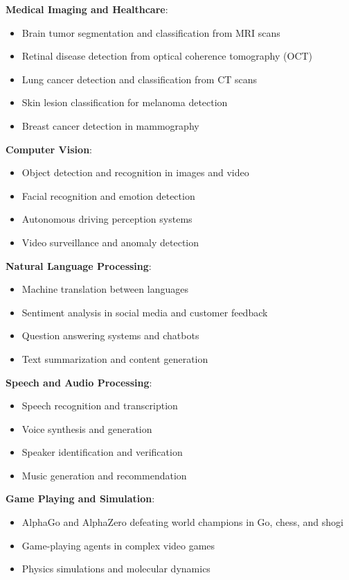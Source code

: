 \textbf{Medical Imaging and Healthcare}:
\begin{itemize}
  \item Brain tumor segmentation and classification from MRI scans \cite{havaei2017brain}
  \item Retinal disease detection from optical coherence tomography (OCT) \cite{de2018clinically}
  \item Lung cancer detection and classification from CT scans \cite{ardila2019end}
  \item Skin lesion classification for melanoma detection \cite{esteva2017dermatologist}
  \item Breast cancer detection in mammography \cite{mckinney2020international}
\end{itemize}

\textbf{Computer Vision}:
\begin{itemize}
  \item Object detection and recognition in images and video
  \item Facial recognition and emotion detection
  \item Autonomous driving perception systems
  \item Video surveillance and anomaly detection
\end{itemize}

\textbf{Natural Language Processing}:
\begin{itemize}
  \item Machine translation between languages
  \item Sentiment analysis in social media and customer feedback
  \item Question answering systems and chatbots
  \item Text summarization and content generation
\end{itemize}

\textbf{Speech and Audio Processing}:
\begin{itemize}
  \item Speech recognition and transcription
  \item Voice synthesis and generation
  \item Speaker identification and verification
  \item Music generation and recommendation
\end{itemize}

\textbf{Game Playing and Simulation}:
\begin{itemize}
  \item AlphaGo and AlphaZero defeating world champions in Go, chess, and shogi
  \item Game-playing agents in complex video games
  \item Physics simulations and molecular dynamics
\end{itemize}

